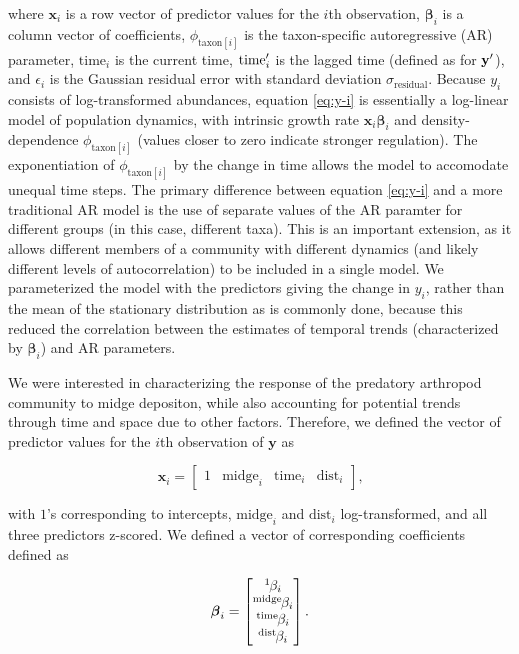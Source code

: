 \noindent where $\mathbf{x}_i$ is a row vector of predictor values for the $i$th
observation, ${\boldsymbol\beta}_i$ is a column vector of coefficients,
$\phi_{\text{taxon}[i]}$ is the taxon-specific autoregressive (AR) parameter,
$\text{time}_i$ is the current time, $\text{time}\sp{\prime}_i$ is the lagged time
(defined as for  $\mathbf{y\sp{\prime}}$), and $\epsilon_i$  is the Gaussian residual
error with standard deviation $\sigma_{\text{residual}}$.
Because $y_i$ consists of log-transformed abundances, equation \ref{eq:y-i} is
essentially a log-linear model of population dynamics, with intrinsic growth rate
$\mathbf{x}_i{\boldsymbol\beta}_i$ and density-dependence $\phi_{\text{taxon}[i]}$
(values closer to zero indicate stronger regulation).
The exponentiation of $\phi_{\text{taxon}[i]}$ by the change in time allows the model
to accomodate unequal time steps.
The primary difference between equation \ref{eq:y-i} and a more traditional AR model
is the use of separate values of the AR paramter for different groups (in this case,
different taxa).
This is an important extension, as it allows different members of a community with
different dynamics (and likely different levels of autocorrelation) to be included
in a single model.
We parameterized the model with the predictors giving the change in $y_i$,
rather than the mean of the stationary distribution as is commonly done,
because this reduced the correlation between the estimates of temporal trends
(characterized by ${\boldsymbol\beta}_i$) and AR parameters.

We were interested in characterizing the response of the predatory arthropod
community to midge depositon, while also accounting for potential trends through
time and space due to other factors.
Therefore, we defined the vector of predictor values for the $i$th observation
of $\mathbf{y}$ as

\begin{equation} \label{eq:x-vec}
    \mathbf{x}_i = \begin{bmatrix}
        1 & \text{midge}_i & \text{time}_i & \text{dist}_i
    \end{bmatrix}\text{,}
\end{equation}

\noindent with $1$'s corresponding to intercepts,
$\text{midge}_i$ and $\text{dist}_i$ log-transformed, and all three predictors
z-scored.
We defined a vector of corresponding coefficients defined as

\begin{equation} \label{eq:beta-vec}
{\boldsymbol\beta}_i = \begin{bmatrix}
    {}^1\hspace*{-1pt}\beta_i \\
    {}^\text{midge}\hspace*{-1pt}\beta_i \\
    {}^\text{time}\hspace*{-1pt}\beta_i \\
    {}^\text{dist}\hspace*{-1pt}\beta_i
    \end{bmatrix}\text{.}
\end{equation}

